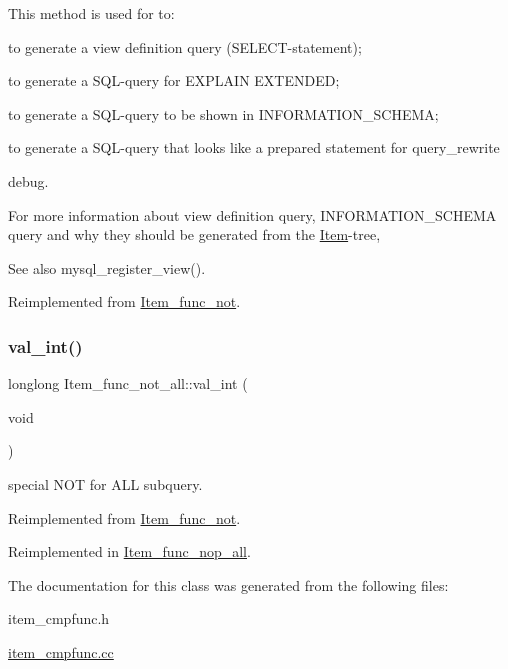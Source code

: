 This method is used for to\+:
\begin{DoxyItemize}
\item to generate a view definition query (S\+E\+L\+E\+CT-\/statement);
\item to generate a S\+QL-\/query for E\+X\+P\+L\+A\+IN E\+X\+T\+E\+N\+D\+ED;
\item to generate a S\+QL-\/query to be shown in I\+N\+F\+O\+R\+M\+A\+T\+I\+O\+N\+\_\+\+S\+C\+H\+E\+MA;
\item to generate a S\+QL-\/query that looks like a prepared statement for query\+\_\+rewrite
\item debug.
\end{DoxyItemize}

For more information about view definition query, I\+N\+F\+O\+R\+M\+A\+T\+I\+O\+N\+\_\+\+S\+C\+H\+E\+MA query and why they should be generated from the \mbox{\hyperlink{classItem}{Item}}-\/tree, \begin{DoxySeeAlso}{See also}
mysql\+\_\+register\+\_\+view(). 
\end{DoxySeeAlso}


Reimplemented from \mbox{\hyperlink{classItem__func__not_a2d11d511c9b23933c2615f703b6e38fa}{Item\+\_\+func\+\_\+not}}.

\mbox{\label{classItem__func__not__all_a8c295f113fceeb1d2f97cf12b0414a40}} 
\subsubsection{\texorpdfstring{val\+\_\+int()}{val\_int()}}
{\footnotesize\ttfamily longlong Item\+\_\+func\+\_\+not\+\_\+all\+::val\+\_\+int (\begin{DoxyParamCaption}\item[{void}]{ }\end{DoxyParamCaption})\hspace{0.3cm}{\ttfamily [virtual]}}

special N\+OT for A\+LL subquery. 

Reimplemented from \mbox{\hyperlink{classItem__func__not}{Item\+\_\+func\+\_\+not}}.



Reimplemented in \mbox{\hyperlink{classItem__func__nop__all_a83df49e5ddb63299f2eea0960d6d80f1}{Item\+\_\+func\+\_\+nop\+\_\+all}}.



The documentation for this class was generated from the following files\+:\begin{DoxyCompactItemize}
\item 
item\+\_\+cmpfunc.\+h\item 
\mbox{\hyperlink{item__cmpfunc_8cc}{item\+\_\+cmpfunc.\+cc}}\end{DoxyCompactItemize}
